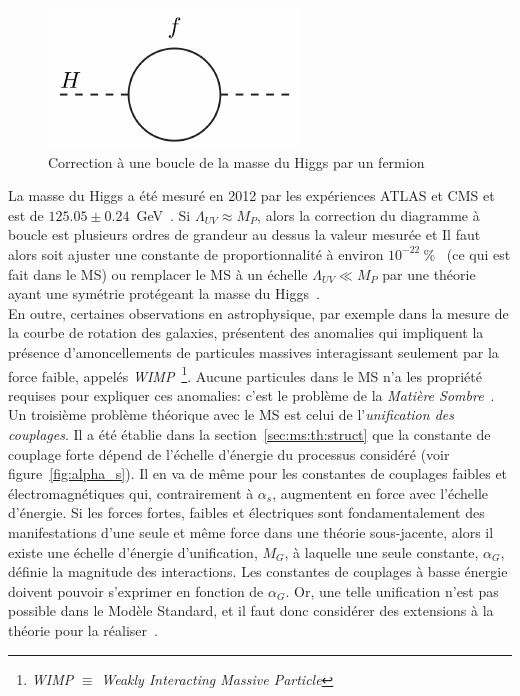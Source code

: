 \begin{figure}
  \centering
  \includegraphics{Higgs-loop.pdf}
  \caption{Correction à une boucle de la masse du Higgs par un fermion}
  \label{fig:hloop}
\end{figure}

La masse du Higgs a été mesuré en 2012 par les expériences ATLAS et
CMS et est de
$125.05 \pm 0.24$~GeV~\cite{atlas_collaboration_combined_2015}. Si
$\Lambda_{UV} \approx M_P$, alors la correction du diagramme à boucle
est plusieurs ordres de grandeur au dessus la valeur mesurée et Il
faut alors soit ajuster une constante de proportionnalité à environ
$10^{-22}~\%$~\cite{giudice_naturally_20087} (ce qui est fait dans le
MS) ou remplacer le MS à un échelle $\Lambda_{UV} \ll M_P$ par une
théorie ayant une symétrie protégeant la masse du
Higgs~\cite{martin_supersymmetry_1997}. \\

En outre, certaines observations en astrophysique, par exemple dans la
mesure de la courbe de rotation des galaxies, présentent des anomalies
qui impliquent la présence d'amoncellements de particules massives
interagissant seulement par la force faible, appelés
\emph{WIMP}~\footnote{\emph{WIMP} $\equiv$ \emph{Weakly Interacting
    Massive Particle}}. Aucune particules dans le MS n'a les propriété
requises pour expliquer ces anomalies: c'est le problème de la
\emph{Matière Sombre}~\cite{bertone_particle_2005}. \\

Un troisième problème théorique avec le MS est celui de
l'\emph{unification des couplages}. Il a été établie dans la
section~\ref{sec:ms:th:struct} que la constante de couplage forte
dépend de l'échelle d'énergie du processus considéré (voir
figure~\ref{fig:alpha_s}). Il en va de même pour les constantes de
couplages faibles et électromagnétiques qui, contrairement à
$\alpha_s$, augmentent en force avec l'échelle d'énergie. Si les
forces fortes, faibles et électriques sont fondamentalement des
manifestations d'une seule et même force dans une théorie
sous-jacente, alors il existe une échelle d'énergie d'unification,
$M_G$, à laquelle une seule constante, $\alpha_G$, définie la magnitude
des interactions. Les constantes de couplages à basse énergie doivent pouvoir
s'exprimer en fonction de $\alpha_G$. Or, une telle unification n'est
pas possible dans le Modèle Standard, et il faut donc considérer des
extensions à la théorie pour la réaliser~\cite{olive_review_2014,thomson_modern_2013}.


